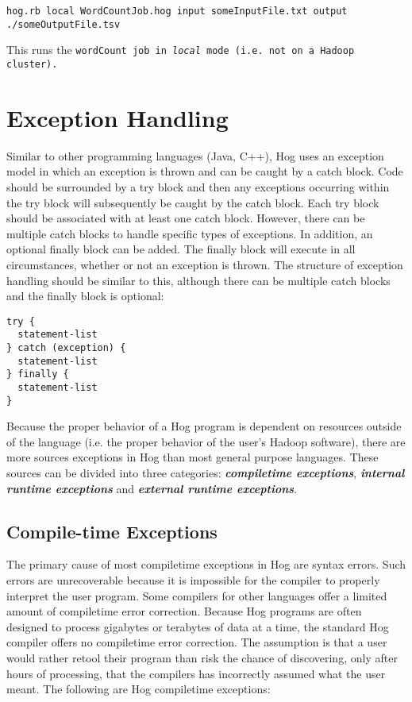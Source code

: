 \documentclass{book}
\begin{document}
\tt hog.rb ­­local WordCountJob.hog ­­input someInputFile.txt ­­output
./someOutputFile.tsv \rm

This runs the \tt wordCount \rm job in \emph{local} mode (i.e. not on a Hadoop
cluster).



\chapter{Exception Handling} %
\label{cha:exception_handling}

Similar to other programming languages (Java, C++), Hog uses an exception model in
which an exception is thrown and can be caught by a catch block. Code should be
surrounded by a try block and then any exceptions occurring within the try block
will subsequently be caught by the catch block. Each try block should be
associated with at least one catch block. However, there can be multiple catch
blocks to handle specific types of exceptions. In addition, an optional finally
block can be added. The finally block will execute in all circumstances, whether
or not an exception is thrown. The structure of exception handling should be
similar to this, although there can be multiple catch blocks and the finally block
is optional:

\begin{verbatim}
try {
  statement-list
} catch (exception) {
  statement-list
} finally {
  statement-list
}
\end{verbatim}

Because the proper behavior of a Hog program is dependent on resources outside of
the language (i.e. the proper behavior of the user’s Hadoop software), there are
more sources exceptions in Hog than most general purpose languages. These sources
can be divided into three categories: \textbf{\emph{compile­time exceptions}},
\textbf{\emph{internal run­time exceptions}} and \textbf{\emph{external run­time
exceptions}}.

\section{Compile-time Exceptions} %
\label{sec:compile_time_exceptions}

The primary cause of most compile­time exceptions in Hog are syntax errors. Such
errors are unrecoverable because it is impossible for the compiler to properly
interpret the user program. Some compilers for other languages offer a limited
amount of compile­time error correction. Because Hog programs are often designed
to process gigabytes or terabytes of data at a time, the standard Hog compiler
offers no compile­time error correction. The assumption is that a user would
rather re­tool their program than risk the chance of discovering, only after hours
of processing, that the compilers has incorrectly assumed what the user meant. The
following are Hog compile­time exceptions:
\end{document}
